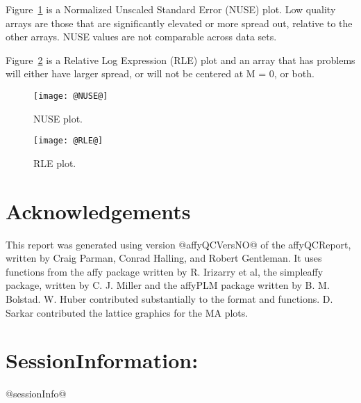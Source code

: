 \documentclass[11pt]{article}
\newcommand{\Rpackage}[1]{{\textsf{#1}}}
\begin{document}
Figure~\ref{fig:NUSE} is a Normalized Unscaled Standard Error (NUSE) 
plot.  Low quality arrays are those that are significantly elevated or 
more spread out, relative to the other arrays.
NUSE values are not comparable across data sets.

Figure~\ref{fig:RLE} is a Relative Log Expression (RLE) plot
and an array that has problems will either have larger spread, or 
will not be centered at M = 0, or both.

\begin{figure}[tp]
  \centering
\texttt{[image: @NUSE@]}
\caption{\label{fig:NUSE}%
NUSE plot.}
\end{figure}

\begin{figure}[tp]
  \centering
\texttt{[image: @RLE@]}
\caption{\label{fig:RLE}%
RLE plot.}
\end{figure}



\section*{Acknowledgements}
\label{sec:ack}

This report was generated using version @affyQCVersNO@ of the 
\Rpackage{affyQCReport}, written by Craig Parman, Conrad Halling, and
Robert Gentleman. It uses functions from the \Rpackage{affy} package
written by R. Irizarry et al, the \Rpackage{simpleaffy} package, written
by C. J. Miller and the \Rpackage{affyPLM} package written by B. M. Bolstad.
W. Huber contributed substantially to the format and functions.
D. Sarkar contributed the lattice graphics for the MA plots.

\section*{SessionInformation: }
@sessionInfo@
\end{document}
